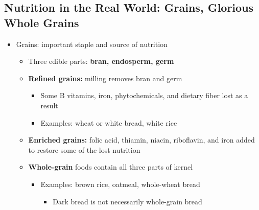 \documentclass[12pt]{article}
\begin{document}
        \subsection{Nutrition in the Real World: Grains, Glorious Whole Grains}
            \begin{itemize}
                \item Grains: important staple and source of nutrition
                    \begin{itemize}
                        \item Three edible parts: \textbf{bran, endosperm, germ}
                        \item \textbf{Refined grains:} milling removes bran and germ
                            \begin{itemize}
                                \item Some B vitamins, iron, phytochemicals, and dietary fiber lost as a result
                                \item Examples: wheat or white bread, white rice
                            \end{itemize}
                        \item \textbf{Enriched grains:} folic acid, thiamin, niacin, riboflavin, and iron added to restore some of the lost nutrition
                        \item \textbf{Whole-grain} foods contain all three parts of kernel
                            \begin{itemize}
                                \item Examples: brown rice, oatmeal, whole-wheat bread
                                    \begin{itemize}
                                        \item Dark bread is not necessarily whole-grain bread
                                    \end{itemize}
                            \end{itemize}
                    \end{itemize}
            \end{itemize}
\end{document}
